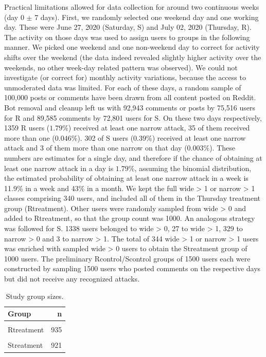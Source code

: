 \documentclass[
  10pt,
  dvipsnames]{scrartcl}
\begin{document}
Practical limitations allowed for data collection for around two
continuous weeks (day 0 \(\pm\) 7 days). First, we randomly selected one
weekend day and one working day. These were June 27, 2020 (Saturday,
\textsf{S}) and July 02, 2020 (Thursday, \textsf{R}). The activity on
those days was used to assign users to groups in the following manner.
We picked one weekend and one non-weekend day to correct for activity
shifts over the weekend (the data indeed revealed slightly higher
activity over the weekends, no other week-day related pattern was
observed). We could not investigate (or correct for) monthly activity
variations, because the access to unmoderated data was limited. For each
of these days, a random sample of 100,000 posts or comments have been
drawn from all content posted on \textsf{Reddit}. Bot removal and
cleanup left us with 92,943 comments or posts by 75,516 users for
\textsf{R} and 89,585 comments by 72,801 users for \textsf{S}. On these
two days respectively, 1359 \textsf{R} users (\(1.79\%\)) received at
least one \textsf{narrow} attack, 35 of them received more than one
(\(0.046\%\)). 302 of \textsf{S} users (\(0.39\%\)) received at least
one \textsf{narrow} attack and 3 of them more than one \textsf{narrow}
on that day (\(0.003\%\)). These numbers are estimates for a single day,
and therefore if the chance of obtaining at least one \textsf{narrow}
attack in a day is \(1.79\%\), assuming the binomial distribution, the
estimated probability of obtaining at least one \textsf{narrow} attack
in a week is 11.9\% in a week and 43\% in a month. We kept the full
\textsf{wide > 1} or \textsf{narrow > 1} classes comprising 340 users,
and included all of them in the Thursday treatment group
(\textsf{Rtreatment}). Other users were randomly sampled from
\textsf{wide > 0} and added to \textsf{Rtreatment}, so that the group
count was 1000. An analogous strategy was followed for \textsf{S}. 1338
users belonged to \textsf{wide > 0}, 27 to \textsf{wide > 1}, 329 to
\textsf{narrow > 0} and 3 to \textsf{narrow > 1}. The total of 344
\textsf{wide > 1} or \textsf{narrow > 1} users was enriched with sampled
\textsf{wide > 0} users to obtain the \textsf{Streatment} group of 1000
users. The preliminary \textsf{Rcontrol}/\textsf{Scontrol} groups of
1500 users each were constructed by sampling 1500 users who posted
comments on the respective days but did not receive any recognized
attacks.

\begin{table}[H]
\footnotesize
\begin{table}[H]
\centering\begingroup\fontsize{9}{11}\selectfont

\begin{tabular}{lr}
\toprule
Group & n\\
\midrule
\cellcolor{gray!6}{Rcontrol} & \cellcolor{gray!6}{875}\\
Rtreatment & 935\\
\cellcolor{gray!6}{Scontrol} & \cellcolor{gray!6}{942}\\
Streatment & 921\\
\bottomrule
\end{tabular}
\endgroup{}
\end{table}
\caption{Study group sizes.}
\label{tab:groups}
\end{table}
\end{document}
